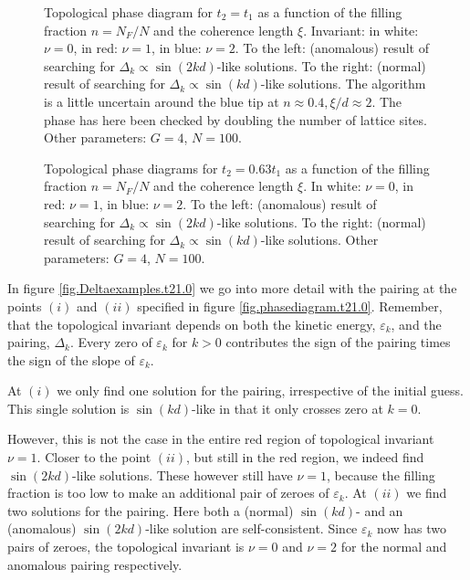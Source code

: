 \begin{figure}
\begin{center}

\caption{Topological phase diagram for $t_2 = t_1$ as a function of the filling fraction $n = N_F/N$ and the coherence length $\xi$. Invariant: in white: $\nu = 0$, in red: $\nu = 1$, in blue: $\nu = 2$. To the left: (anomalous) result of searching for $\Delta_k\propto \sin(2kd)$-like solutions. To the right: (normal) result of searching for $\Delta_k \propto \sin(kd)$-like solutions. The algorithm is a little uncertain around the blue tip at $n \approx 0.4, \xi / d \approx 2$. The phase has here been checked by doubling the number of lattice sites. Other parameters: $G = 4$, $N = 100$. }
\label{fig.phasediagram.t21.0}
\vspace{0.5cm}

\caption{Topological phase diagrams for $t_2 = 0.63t_1$ as a function of the filling fraction $n = N_F/N$ and the coherence length $\xi$. In white: $\nu = 0$, in red: $\nu = 1$, in blue: $\nu = 2$. To the left: (anomalous) result of searching for $\Delta_k\propto \sin(2kd)$-like solutions. To the right: (normal) result of searching for $\Delta_k \propto \sin(kd)$-like solutions. Other parameters: $G = 4$, $N = 100$. }
\label{fig.phasediagram.t20.63}
\end{center}
\end{figure}

In figure \ref{fig.Deltaexamples.t21.0} we go into more detail with the pairing at the points $(i)$ and $(ii)$ specified in figure \ref{fig.phasediagram.t21.0}. Remember, that the topological invariant depends on both the kinetic energy, $\varepsilon_k$, and the pairing, $\Delta_k$. Every zero of $\varepsilon_k$ for $k > 0$ contributes the sign of the pairing times the sign of the slope of $\varepsilon_k$. 

 At $(i)$ we only find one solution for the pairing, irrespective of the initial guess. This single solution is $\sin(kd)$-like in that it only crosses zero at $k = 0$. 




However, this is not the case in the entire red region of topological invariant $\nu = 1$. Closer to the point $(ii)$, but still in the red region, we indeed find $\sin(2kd)$-like solutions. These however still have $\nu = 1$, because the filling fraction is too low to make an additional pair of zeroes of $\varepsilon_k$. At $(ii)$ we find two solutions for the pairing. Here both a (normal) $\sin(kd)$- and an (anomalous) $\sin(2kd)$-like solution are self-consistent. Since $\varepsilon_k$ now has two pairs of zeroes, the topological invariant is $\nu = 0$ and $\nu = 2$ for the normal and anomalous pairing respectively.   


